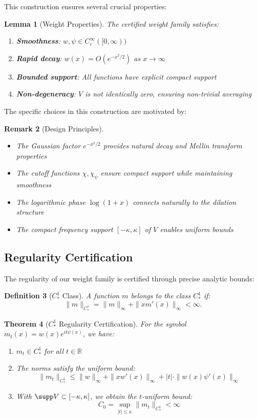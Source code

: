\documentclass[11pt,hyp,]{nyjm}
\newtheorem{theorem}{Theorem}
\newtheorem{lemma}[theorem]{Lemma}
\newtheorem{definition}[theorem]{Definition}
\newtheorem{remark}[theorem]{Remark}
\begin{document}
This construction ensures several crucial properties:

\begin{lemma}[Weight Properties]\label{lem:weight-properties}
The certified weight family satisfies:
\begin{enumerate}
\item \textbf{Smoothness}: $w, \psi \in C_c^\infty([0,\infty))$
\item \textbf{Rapid decay}: $w(x) = O(e^{-x^2/2})$ as $x \to \infty$
\item \textbf{Bounded support}: All functions have explicit compact support
\item \textbf{Non-degeneracy}: $V$ is not identically zero, ensuring non-trivial averaging
\end{enumerate}
\end{lemma}

The specific choices in this construction are motivated by:

\begin{remark}[Design Principles]
\begin{itemize}
\item The Gaussian factor $e^{-x^2/2}$ provides natural decay and Mellin transform properties
\item The cutoff functions $\chi, \chi_\psi$ ensure compact support while maintaining smoothness
\item The logarithmic phase $\log(1+x)$ connects naturally to the dilation structure
\item The compact frequency support $[-\kappa,\kappa]$ of $V$ enables uniform bounds
\end{itemize}
\end{remark}

\subsection{Regularity Certification}

The regularity of our weight family is certified through precise analytic bounds:

\begin{definition}[$C^1_*$ Class]\label{def:C1star}
A function $m$ belongs to the class $C^1_*$ if:
\[
\|m\|_{C^1_*} = \|m\|_\infty + \|x m'(x)\|_\infty < \infty.
\]
\end{definition}

\begin{theorem}[$C^1_*$ Regularity Certification]\label{thm:C1star-regularity}
For the symbol $m_t(x) = w(x)e^{it\psi(x)}$, we have:
\begin{enumerate}
\item $m_t \in C^1_*$ for all $t \in \mathbb{R}$
\item The norms satisfy the uniform bound:
\[
\|m_t\|_{C^1_*} \leq \|w\|_\infty + \|x w'(x)\|_\infty + |t| \cdot \|w(x)\psi'(x)\|_\infty
\]
\item With $\supp V \subset [-\kappa,\kappa]$, we obtain the $t$-uniform bound:
\[
C_0 = \sup_{|t| \leq \kappa} \|m_t\|_{C^1_*} < \infty
\]
\end{enumerate}
\end{theorem}
\end{document}
